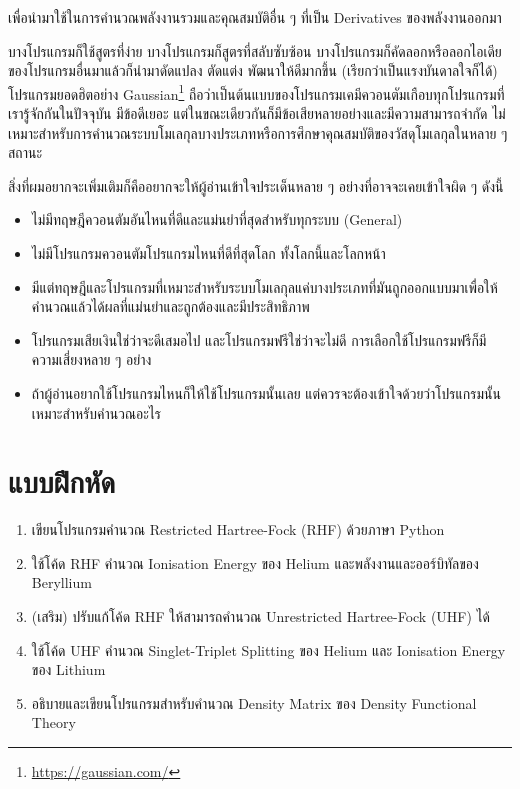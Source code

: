 \noindent เพื่อนำมาใช้ในการคำนวณพลังงานรวมและคุณสมบัติอื่น ๆ ที่เป็น Derivatives ของพลังงานออกมา

บางโปรแกรมก็ใช้สูตรที่ง่าย บางโปรแกรมก็สูตรที่สลับซับซ้อน บางโปรแกรมก็คัดลอกหรือลอกไอเดียของโปรแกรมอื่นมาแล้วก็นำมาดัดแปลง ตัดแต่ง พัฒนาให้ดีมากขึ้น (เรียกว่าเป็นแรงบันดาลใจก็ได้) โปรแกรมยอดฮิตอย่าง Gaussian\footnote{\url{https://gaussian.com/}} ถือว่าเป็นต้นแบบของโปรแกรมเคมีควอนตัมเกือบทุกโปรแกรมที่เรารู้จักกันในปัจจุบัน มีข้อดีเยอะ แต่ในขณะเดียวกันก็มีข้อเสียหลายอย่างและมีความสามารถจำกัด ไม่เหมาะสำหรับการคำนวณระบบโมเลกุลบางประเภทหรือการศึกษาคุณสมบัติของวัสดุโมเลกุลในหลาย ๆ สถานะ

สิ่งที่ผมอยากจะเพิ่มเติมก็คืออยากจะให้ผู้อ่านเข้าใจประเด็นหลาย ๆ อย่างที่อาจจะเคยเข้าใจผิด ๆ ดังนี้
%
\begin{itemize}[topsep=0pt,noitemsep]
  \setlength\itemsep{0.5em}
  \item ไม่มีทฤษฎีควอนตัมอันไหนที่ดีและแม่นยำที่สุดสำหรับทุกระบบ (General)

  \item ไม่มีโปรแกรมควอนตัมโปรแกรมไหนที่ดีที่สุดโลก ทั้งโลกนี้และโลกหน้า

  \item มีแต่ทฤษฎีและโปรแกรมที่เหมาะสำหรับระบบโมเลกุลแค่บางประเภทที่มันถูกออกแบบมาเพื่อให้คำนวณแล้วได้ผลที่แม่นยำและถูกต้องและมีประสิทธิภาพ

  \item โปรแกรมเสียเงินใช่ว่าจะดีเสมอไป และโปรแกรมฟรีใช่ว่าจะไม่ดี การเลือกใช้โปรแกรมฟรีก็มีความเสี่ยงหลาย ๆ อย่าง

  \item ถ้าผู้อ่านอยากใช้โปรแกรมไหนก็ให้ใช้โปรแกรมนั้นเลย แต่ควรจะต้องเข้าใจด้วยว่าโปรแกรมนั้นเหมาะสำหรับคำนวณอะไร
\end{itemize}

\section{แบบฝึกหัด}

\begin{enumerate}[topsep=0pt,noitemsep]
  \setlength\itemsep{0.5em}
  \item เขียนโปรแกรมคำนวณ Restricted Hartree-Fock (RHF) ด้วยภาษา Python

  \item ใช้โค้ด RHF คำนวณ Ionisation Energy ของ Helium และพลังงานและออร์บิทัลของ Beryllium

  \item (เสริม) ปรับแก้โค้ด RHF ให้สามารถคำนวณ Unrestricted Hartree-Fock (UHF) ได้

  \item ใช้โค้ด UHF คำนวณ Singlet-Triplet Splitting ของ Helium และ Ionisation Energy ของ Lithium

  \item อธิบายและเขียนโปรแกรมสำหรับคำนวณ Density Matrix ของ Density Functional Theory
\end{enumerate}
